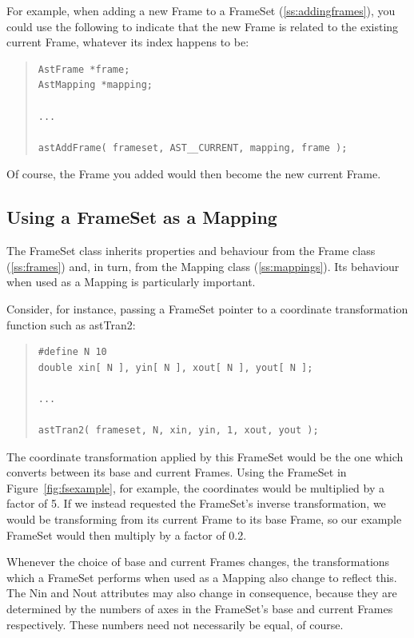 \documentclass[twoside,11pt]{article}
\newcommand{\htmlref}[2]{#1}
\newcommand{\secref}[1]{\S\ref{#1}}
\renewcommand{\secref}[1]{\ref{#1}}
\begin{document}
For example, when adding a new Frame to a FrameSet
(\secref{ss:addingframes}), you could use the following to indicate
that the new Frame is related to the existing current Frame, whatever
its index happens to be:

\begin{quote}
\small
\begin{verbatim}
AstFrame *frame;
AstMapping *mapping;

...

astAddFrame( frameset, AST__CURRENT, mapping, frame );
\end{verbatim}
\normalsize
\end{quote}

Of course, the Frame you added would then become the new current
Frame.

\subsection{\label{ss:framesetasmapping}Using a FrameSet as a Mapping}

The \htmlref{FrameSet}{FrameSet} class inherits properties and behaviour from the \htmlref{Frame}{Frame}
class (\secref{ss:frames}) and, in turn, from the \htmlref{Mapping}{Mapping} class
(\secref{ss:mappings}). Its behaviour when used as a Mapping is
particularly important.

Consider, for instance, passing a FrameSet pointer to a coordinate
transformation function such as \htmlref{astTran2}{astTran2}:

\begin{quote}
\small
\begin{verbatim}
#define N 10
double xin[ N ], yin[ N ], xout[ N ], yout[ N ];

...

astTran2( frameset, N, xin, yin, 1, xout, yout );
\end{verbatim}
\normalsize
\end{quote}

The coordinate transformation applied by this FrameSet would be the
one which converts between its base and current Frames. Using the
FrameSet in Figure~\ref{fig:fsexample}, for example, the coordinates
would be multiplied by a factor of 5.  If we instead requested the
FrameSet's inverse transformation, we would be transforming from its
current Frame to its base Frame, so our example FrameSet would then
multiply by a factor of 0.2.

Whenever the choice of base and current Frames changes, the
transformations which a FrameSet performs when used as a Mapping also
change to reflect this. The \htmlref{Nin}{Nin} and \htmlref{Nout}{Nout} attributes may also change in
consequence, because they are determined by the numbers of axes in the
FrameSet's base and current Frames respectively. These numbers need
not necessarily be equal, of course.
\end{document}
